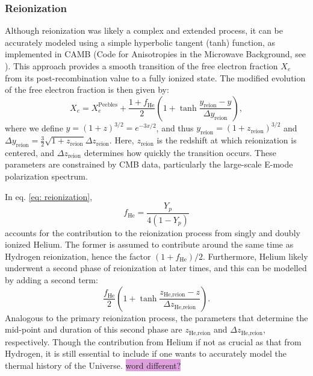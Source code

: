 \documentclass{aa}
\numberwithin{equation}{section}
\numberwithin{table}{section}
\numberwithin{figure}{section}
\begin{document}
\subsubsection{Reionization}\label{subsubsec: II theory reionization}
Although reionization was likely a complex and extended process, it can be accurately modeled using a simple hyperbolic tangent (tanh) function, as implemented in CAMB (Code for Anisotropies in the Microwave Background, see \cite{camb2}). This approach provides a smooth transition of the free electron fraction $X_e$ from its post-recombination value to a fully ionized state. The modified evolution of the free electron fraction is then given by:
\begin{equation}
  X_e = X_e^\text{Peebles} + \frac{1 + f_{\text{He}}}{2} \left( 1 + \tanh \frac{y_{\text{reion}} - y}{\Delta y_{\text{reion}}} \right), \label{eq: reionization}
\end{equation}
where we define $y = (1+z)^{3/2} = e^{-3x/2}$, and thus $y_{\text{reion}} = (1+z_{\text{reion}})^{3/2}$ and $\Delta y_{\text{reion}} = \frac{3}{2} \sqrt{1+z_{\text{reion}}} \Delta z_{\text{reion}}$. Here, $z_{\text{reion}}$ is the redshift at which reionization is centered, and $\Delta z_{\text{reion}}$ determines how quickly the transition occurs. These parameters are constrained by CMB data, particularly the large-scale E-mode polarization spectrum. 

In eq. \eqref{eq: reionization},
\begin{equation}
  f_{\text{He}} = \frac{Y_p}{4(1-Y_p)}
\end{equation} 
accounts for the contribution to the reionization process from singly and doubly ionized Helium. The former is assumed to contribute around the same time as Hydrogen reionization, hence the factor $(1+f_\text{He})/2$. Furthermore, Helium likely underwent a second phase of reionization at later times, and this can be modelled by adding a second term:
\begin{equation}
  \frac{f_{\text{He}}}{2} \left( 1 + \tanh \frac{z_{\text{He,reion}} - z}{\Delta z_{\text{He,reion}}}\right).
\end{equation}
Analogous to the primary reionization process, the parameters that determine the mid-point and duration of this second phase are $z_\text{He,reion}$ and $\Delta z_\text{He,reion}$, respectively. Though the contribution from Helium if not as crucial as that from Hydrogen, it is still essential to include if one wants to accurately model the thermal history of the Universe. \colorbox{Plum}{word different?}
\end{document}
